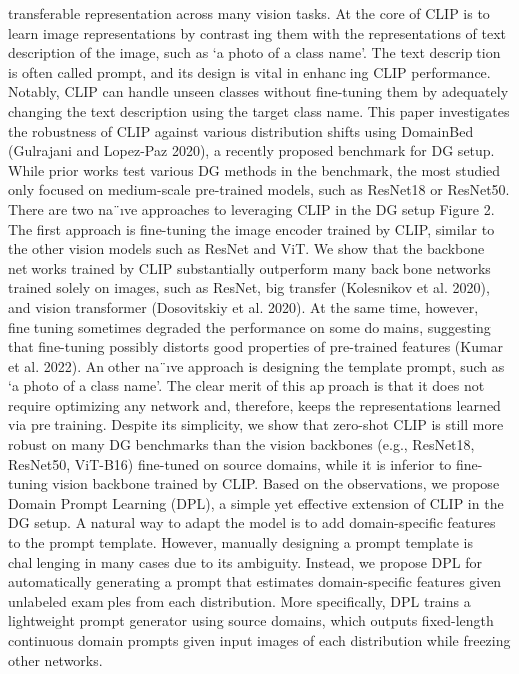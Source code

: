 \documentclass{article}
\begin{document}
\begin{multicols}{2}
transferable representation across many vision tasks. At the
core of CLIP is to learn image representations by contrasting them with the representations of text description of the
image, such as ‘a photo of a {class name}’. The text description is often called prompt, and its design is vital in enhancing CLIP performance. Notably, CLIP can handle unseen
classes without fine-tuning them by adequately changing the
text description using the target class name.
This paper investigates the robustness of CLIP against
various distribution shifts using DomainBed (Gulrajani and
Lopez-Paz 2020), a recently proposed benchmark for DG
setup. While prior works test various DG methods in the
benchmark, the most studied only focused on medium-scale
pre-trained models, such as ResNet18 or ResNet50. There
are two na¨ıve approaches to leveraging CLIP in the DG
setup Figure 2. The first approach is fine-tuning the image encoder trained by CLIP, similar to the other vision models
such as ResNet and ViT. We show that the backbone networks trained by CLIP substantially outperform many backbone networks trained solely on images, such as ResNet,
big transfer (Kolesnikov et al. 2020), and vision transformer
(Dosovitskiy et al. 2020). At the same time, however, finetuning sometimes degraded the performance on some domains, suggesting that fine-tuning possibly distorts good
properties of pre-trained features (Kumar et al. 2022). Another na¨ıve approach is designing the template prompt, such
as ‘a photo of a {class name}’. The clear merit of this approach is that it does not require optimizing any network
and, therefore, keeps the representations learned via pretraining. Despite its simplicity, we show that zero-shot CLIP
is still more robust on many DG benchmarks than the vision
backbones (e.g., ResNet18, ResNet50, ViT-B16) fine-tuned
on source domains, while it is inferior to fine-tuning vision
backbone trained by CLIP.
Based on the observations, we propose Domain Prompt
Learning (DPL), a simple yet effective extension of CLIP
in the DG setup. A natural way to adapt the model is
to add domain-specific features to the prompt template.
However, manually designing a prompt template is challenging in many cases due to its ambiguity. Instead, we
propose DPL for automatically generating a prompt that
estimates domain-specific features given unlabeled examples from each distribution. More specifically, DPL trains a
lightweight prompt generator using source domains, which
outputs fixed-length continuous domain prompts given input
images of each distribution while freezing other networks.

\end{multicols}
\end{document}
